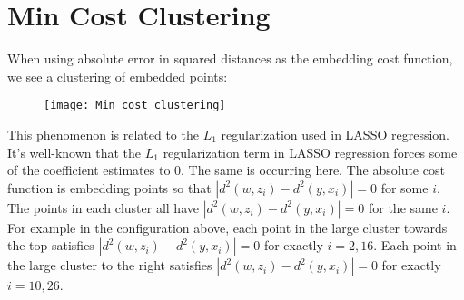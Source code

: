 \documentclass{article}
\begin{document}
\section{Min Cost Clustering}
When using absolute error in squared distances as the embedding cost function, we see a clustering of embedded points:

\begin{figure}[h]
\texttt{[image: Min cost clustering]}
\centering
\end{figure}

\noindent This phenomenon is related to the $L_1$ regularization used in LASSO regression. It's well-known that the $L_1$ regularization term in LASSO regression forces some of the coefficient estimates to 0. The same is occurring here. The absolute cost function is embedding points so that $\left| d^2(w,z_i) - d^2(y, x_i) \right| = 0$ for some $i$. The points in each cluster all have $\left| d^2(w,z_i) - d^2(y, x_i) \right| = 0$ for the same $i$. For example in the configuration above, each point in the large cluster towards the top satisfies $\left| d^2(w,z_i) - d^2(y, x_i) \right| = 0$ for exactly $i = 2, 16$. Each point in the large cluster to the right satisfies $\left| d^2(w,z_i) - d^2(y, x_i) \right| = 0$ for exactly $i = 10, 26$.
\end{document}
